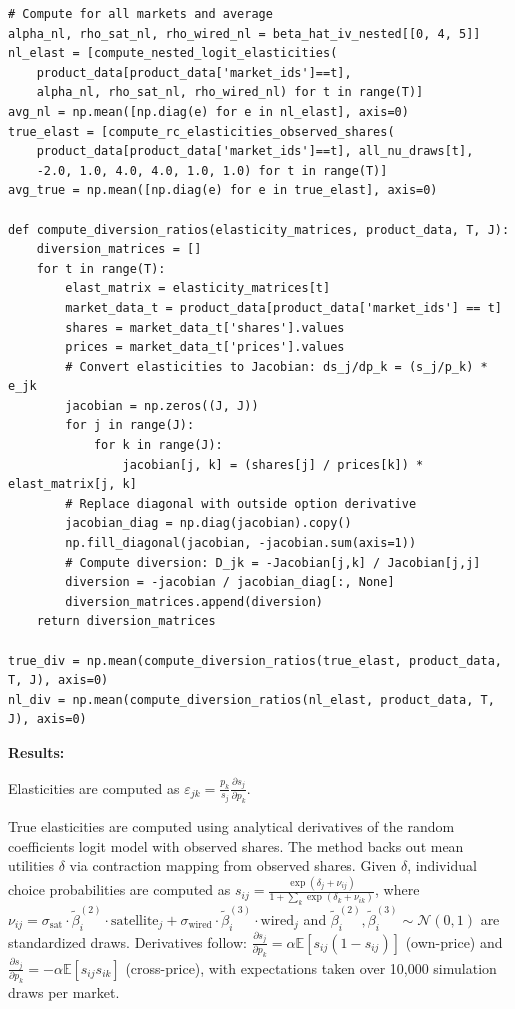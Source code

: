 \documentclass[english,11pt]{article}
\begin{document}
\begin{verbatim}
# Compute for all markets and average
alpha_nl, rho_sat_nl, rho_wired_nl = beta_hat_iv_nested[[0, 4, 5]]
nl_elast = [compute_nested_logit_elasticities(
    product_data[product_data['market_ids']==t], 
    alpha_nl, rho_sat_nl, rho_wired_nl) for t in range(T)]
avg_nl = np.mean([np.diag(e) for e in nl_elast], axis=0)
true_elast = [compute_rc_elasticities_observed_shares(
    product_data[product_data['market_ids']==t], all_nu_draws[t], 
    -2.0, 1.0, 4.0, 4.0, 1.0, 1.0) for t in range(T)]
avg_true = np.mean([np.diag(e) for e in true_elast], axis=0)

def compute_diversion_ratios(elasticity_matrices, product_data, T, J):
    diversion_matrices = []
    for t in range(T):
        elast_matrix = elasticity_matrices[t]
        market_data_t = product_data[product_data['market_ids'] == t]
        shares = market_data_t['shares'].values
        prices = market_data_t['prices'].values
        # Convert elasticities to Jacobian: ds_j/dp_k = (s_j/p_k) * e_jk
        jacobian = np.zeros((J, J))
        for j in range(J):
            for k in range(J):
                jacobian[j, k] = (shares[j] / prices[k]) * elast_matrix[j, k]
        # Replace diagonal with outside option derivative
        jacobian_diag = np.diag(jacobian).copy()
        np.fill_diagonal(jacobian, -jacobian.sum(axis=1))
        # Compute diversion: D_jk = -Jacobian[j,k] / Jacobian[j,j]
        diversion = -jacobian / jacobian_diag[:, None]
        diversion_matrices.append(diversion)
    return diversion_matrices
    
true_div = np.mean(compute_diversion_ratios(true_elast, product_data, T, J), axis=0)
nl_div = np.mean(compute_diversion_ratios(nl_elast, product_data, T, J), axis=0)
\end{verbatim}


\noindent \textbf{Results:} 

\noindent Elasticities are computed as $\varepsilon_{jk} = \frac{p_k}{s_j} \frac{\partial s_j}{\partial p_k}$. 

True elasticities are computed using analytical derivatives of the random coefficients logit model \citep{berry1995automobile} with observed shares. The method backs out mean utilities $\delta$ via contraction mapping \citep{berry1994estimating} from observed shares. Given $\delta$, individual choice probabilities are computed as $s_{ij} = \frac{\exp(\delta_j + \nu_{ij})}{1 + \sum_k \exp(\delta_k + \nu_{ik})}$, where $\nu_{ij} = \sigma_{\text{sat}} \cdot \tilde{\beta}_i^{(2)} \cdot \text{satellite}_j + \sigma_{\text{wired}} \cdot \tilde{\beta}_i^{(3)} \cdot \text{wired}_j$ and $\tilde{\beta}_i^{(2)}, \tilde{\beta}_i^{(3)} \sim \mathcal{N}(0,1)$ are standardized draws. Derivatives follow: $\frac{\partial s_j}{\partial p_k} = \alpha \mathbb{E}[s_{ij}(1-s_{ij})]$ (own-price) and $\frac{\partial s_j}{\partial p_k} = -\alpha \mathbb{E}[s_{ij}s_{ik}]$ (cross-price), with expectations taken over 10,000 simulation draws per market.
\end{document}
